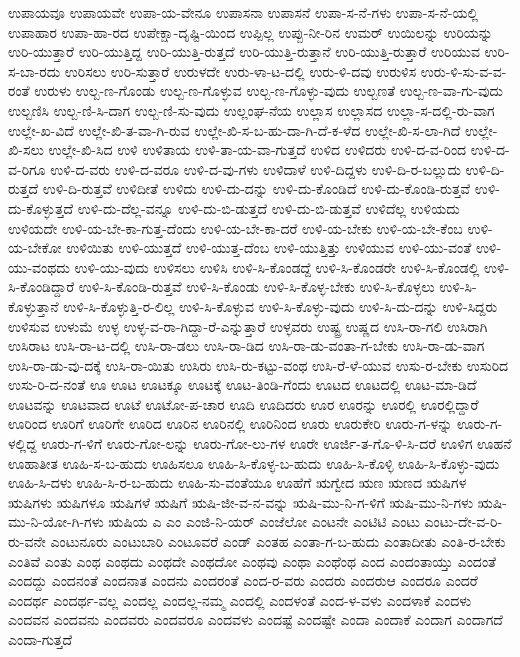{ಉಪಾಯವೂ
ಉಪಾಯವೇ
ಉಪಾ-ಯ-ವೇನೂ
ಉಪಾಸನಾ
ಉಪಾಸನೆ
ಉಪಾ-ಸ-ನೆ-ಗಳು
ಉಪಾ-ಸ-ನೆ-ಯಲ್ಲಿ
ಉಪಾಹಾರ
ಉಪಾ-ಹಾ-ರದ
ಉಪೇಕ್ಷಾ-ದೃಷ್ಟಿ-ಯಿಂದ
ಉಪ್ಪಿಲ್ಲ
ಉಪ್ಪು-ನೀ-ರಿನ
ಉಮರ್
ಉಯಿಲನ್ನು
ಉರಿಯನ್ನು
ಉರಿ-ಯುತ್ತಾರೆ
ಉರಿ-ಯುತ್ತಿದ್ದ
ಉರಿ-ಯುತ್ತಿ-ರುತ್ತದೆ
ಉರಿ-ಯುತ್ತಿ-ರುತ್ತಾನೆ
ಉರಿ-ಯುತ್ತಿ-ರುತ್ತಾರೆ
ಉರಿಯುವ
ಉರಿ-ಸ-ಬಾ-ರದು
ಉರಿಸಲು
ಉರಿ-ಸುತ್ತಾರೆ
ಉರುಳದೇ
ಉರು-ಳಾ-ಟ-ದಲ್ಲಿ
ಉರು-ಳಿ-ದವು
ಉರುಳಿಸ
ಉರು-ಳಿ-ಸು-ವ-ವ-ರಂತೆ
ಉರುಳು
ಉಲ್ಬ-ಣ-ಗೊಂಡು
ಉಲ್ಬ-ಣ-ಗೊಳ್ಳುವ
ಉಲ್ಬ-ಣ-ಗೊಳ್ಳು-ವುದು
ಉಲ್ಬಣತೆ
ಉಲ್ಬ-ಣ-ವಾ-ಗು-ವುದು
ಉಲ್ಬಣಿಸಿ
ಉಲ್ಬ-ಣಿ-ಸಿ-ದಾಗ
ಉಲ್ಬ-ಣಿ-ಸು-ವುದು
ಉಲ್ಲಂಘ-ನೆಯ
ಉಲ್ಲಾಸ
ಉಲ್ಲಾಸದ
ಉಲ್ಲಾ-ಸ-ದಲ್ಲಿ-ರು-ವಾಗ
ಉಲ್ಲೇ-ಖ-ವಿದೆ
ಉಲ್ಲೇ-ಖಿ-ತ-ವಾ-ಗಿ-ರುವ
ಉಲ್ಲೇ-ಖಿ-ಸ-ಬ-ಹು-ದಾ-ಗಿ-ದೆ-ಕ-ಳೆದ
ಉಲ್ಲೇ-ಖಿ-ಸ-ಲಾ-ಗಿದೆ
ಉಲ್ಲೇ-ಖಿ-ಸಲು
ಉಲ್ಲೇ-ಖಿ-ಸಿದ
ಉಳಿ
ಉಳಿತಾಯ
ಉಳಿ-ತಾ-ಯ-ವಾ-ಗುತ್ತದೆ
ಉಳಿದ
ಉಳಿದರು
ಉಳಿ-ದ-ವ-ರಿಂದ
ಉಳಿ-ದ-ವ-ರಿಗೂ
ಉಳಿ-ದ-ವರು
ಉಳಿ-ದ-ವರೂ
ಉಳಿ-ದ-ವು-ಗಳು
ಉಳಿದಾಳೆ
ಉಳಿ-ದಿದ್ದಳು
ಉಳಿ-ದಿ-ರ-ಬಲ್ಲುದು
ಉಳಿ-ದಿ-ರುತ್ತದೆ
ಉಳಿ-ದಿ-ರುತ್ತವೆ
ಉಳಿದೀತೆ
ಉಳಿದು
ಉಳಿ-ದು-ದನ್ನು
ಉಳಿ-ದು-ಕೊಂಡಿದೆ
ಉಳಿ-ದು-ಕೊಂಡಿ-ರುತ್ತವೆ
ಉಳಿ-ದು-ಕೊಳ್ಳುತ್ತದೆ
ಉಳಿ-ದು-ದೆಲ್ಲ-ವನ್ನೂ
ಉಳಿ-ದು-ಬಿ-ಡುತ್ತದೆ
ಉಳಿ-ದು-ಬಿ-ಡುತ್ತವೆ
ಉಳಿದೆಲ್ಲ
ಉಳಿಯದು
ಉಳಿಯದೇ
ಉಳಿ-ಯ-ಬೇ-ಕಾ-ಗುತ್ತ-ದೆಂದು
ಉಳಿ-ಯ-ಬೇ-ಕಾ-ದರೆ
ಉಳಿ-ಯ-ಬೇಕು
ಉಳಿ-ಯ-ಬೇ-ಕೆಂಬ
ಉಳಿ-ಯ-ಬೇಕೋ
ಉಳಿಯಿತು
ಉಳಿ-ಯುತ್ತದೆ
ಉಳಿ-ಯುತ್ತ-ದೆಂಬ
ಉಳಿ-ಯುತ್ತಿತ್ತು
ಉಳಿಯುವ
ಉಳಿ-ಯು-ವಂತೆ
ಉಳಿ-ಯು-ವಂಥದು
ಉಳಿ-ಯು-ವುದು
ಉಳಿಸಲು
ಉಳಿಸಿ
ಉಳಿ-ಸಿ-ಕೊಂಡದ್ದೆ
ಉಳಿ-ಸಿ-ಕೊಂಡರೇ
ಉಳಿ-ಸಿ-ಕೊಂಡಲ್ಲಿ
ಉಳಿ-ಸಿ-ಕೊಂಡಿದ್ದಾರೆ
ಉಳಿ-ಸಿ-ಕೊಂಡಿ-ರುತ್ತವೆ
ಉಳಿ-ಸಿ-ಕೊಂಡು
ಉಳಿ-ಸಿ-ಕೊಳ್ಳ-ಬೇಕು
ಉಳಿ-ಸಿ-ಕೊಳ್ಳಲು
ಉಳಿ-ಸಿ-ಕೊಳ್ಳುತ್ತಾನೆ
ಉಳಿ-ಸಿ-ಕೊಳ್ಳುತ್ತಿ-ರ-ಲಿಲ್ಲ
ಉಳಿ-ಸಿ-ಕೊಳ್ಳುವ
ಉಳಿ-ಸಿ-ಕೊಳ್ಳು-ವುದು
ಉಳಿ-ಸಿ-ದು-ದನ್ನು
ಉಳಿ-ಸಿದ್ದರು
ಉಳಿಸುವ
ಉಳುಮೆ
ಉಳ್ಳ
ಉಳ್ಳ-ವ-ರಾ-ಗಿದ್ದಾ-ರೆ-ಎನ್ನುತ್ತಾರೆ
ಉಳ್ಳವರು
ಉಷ್ಟ್ರ
ಉಷ್ಣದ
ಉಸಿ-ರಾ-ಗಲಿ
ಉಸಿರಾಗಿ
ಉಸಿರಾಟ
ಉಸಿ-ರಾ-ಟ-ದಲ್ಲಿ
ಉಸಿ-ರಾ-ಡಲು
ಉಸಿ-ರಾ-ಡಿದ
ಉಸಿ-ರಾ-ಡು-ವಂತಾ-ಗ-ಬೇಕು
ಉಸಿ-ರಾ-ಡು-ವಾಗ
ಉಸಿ-ರಾ-ಡು-ವು-ದಕ್ಕೆ
ಉಸಿ-ರಾ-ಯಿತು
ಉಸಿರು
ಉಸಿ-ರು-ಕಟ್ಟು-ವಂಥ
ಉಸಿ-ರೆ-ಳೆ-ಯುವ
ಉಸು-ರ-ಬೇಕು
ಉಸುರಿದ
ಉಸು-ರಿ-ದ-ನಂತೆ
ಊ
ಊಟ
ಊಟಕ್ಕೂ
ಊಟಕ್ಕೆ
ಊಟ-ತಿಂಡಿ-ಗೆಂದು
ಊಟದ
ಊಟದಲ್ಲಿ
ಊಟ-ಮಾ-ಡಿದೆ
ಊಟವನ್ನು
ಊಟವಾದ
ಊಟೆ
ಊಟೋ-ಪ-ಚಾರ
ಊದಿ
ಊದಿದರು
ಊರ
ಊರನ್ನು
ಊರಲ್ಲಿ
ಊರಲ್ಲಿದ್ದಾರೆ
ಊರಿಂದ
ಊರಿಗೆ
ಊರಿಗೇ
ಊರಿದ
ಊರಿನ
ಊರಿನಲ್ಲಿ
ಊರಿನಿಂದ
ಊರು
ಊರುಕೇರಿ
ಊರು-ಗ-ಳನ್ನು
ಊರು-ಗ-ಳಲ್ಲಿದ್ದ
ಊರು-ಗ-ಳಿಗೆ
ಊರು-ಗೋ-ಲನ್ನು
ಊರು-ಗೋ-ಲು-ಗಳ
ಊರೇ
ಊರ್ಜಿ-ತ-ಗೊ-ಳಿ-ಸಿ-ದರೆ
ಊಳಿಗ
ಊಹನೆ
ಊಹಾತೀತ
ಊಹಿ-ಸ-ಬ-ಹುದು
ಊಹಿಸಲೂ
ಊಹಿ-ಸಿ-ಕೊಳ್ಳ-ಬ-ಹುದು
ಊಹಿ-ಸಿ-ಕೊಳ್ಳಿ
ಊಹಿ-ಸಿ-ಕೊಳ್ಳು-ವುದು
ಊಹಿ-ಸಿ-ದಳು
ಊಹಿ-ಸಿ-ರ-ಬ-ಹುದು
ಊಹಿ-ಸು-ವಂತೆಯೂ
ಊಹೆಗೆ
ಋಗ್ವೇದ
ಋಣ
ಋಣದ
ಋಷಿಗಳ
ಋಷಿಗಳು
ಋಷಿಗಳೂ
ಋಷಿಗಳೆ
ಋಷಿಗೆ
ಋಷಿ-ಜೀ-ವ-ನ-ವನ್ನು
ಋಷಿ-ಮು-ನಿ-ಗ-ಳಿಗೆ
ಋಷಿ-ಮು-ನಿ-ಗಳು
ಋಷಿ-ಮು-ನಿ-ಯೋ-ಗಿ-ಗಳು
ಋಷಿಯ
ಎ
ಎಂ
ಎಂಜಿ-ನಿ-ಯರ್
ಎಂಜೆಲೋ
ಎಂಟನೇ
ಎಂಟಿಟಿ
ಎಂಟು
ಎಂಟು-ದೇ-ವ-ರಿ-ರು-ವನೇ
ಎಂಟುನೂರು
ಎಂಟುಬಾರಿ
ಎಂಟೂವರೆ
ಎಂಡ್
ಎಂತಹ
ಎಂತಾ-ಗ-ಬ-ಹುದು
ಎಂತಾದೀತು
ಎಂತಿ-ರ-ಬೇಕು
ಎಂತಿವೆ
ಎಂತು
ಎಂಥ
ಎಂಥದು
ಎಂಥದೇ
ಎಂಥದೋ
ಎಂಥವು
ಎಂಥಾ
ಎಂಥೆಂಥ
ಎಂದ
ಎಂದಂತಾಯ್ತು
ಎಂದಂತೆ
ಎಂದದ್ದು
ಎಂದನಂತೆ
ಎಂದನಾತ
ಎಂದನು
ಎಂದರಂತೆ
ಎಂದ-ರ-ವರು
ಎಂದರು
ಎಂದರುಆ
ಎಂದರೂ
ಎಂದರೆ
ಎಂದರ್ಥ
ಎಂದರ್ಥ-ವಲ್ಲ
ಎಂದಲ್ಲ
ಎಂದಲ್ಲ-ನಮ್ಮ
ಎಂದಲ್ಲಿ
ಎಂದಳಂತೆ
ಎಂದ-ಳ-ವಳು
ಎಂದಳಾಕೆ
ಎಂದಳು
ಎಂದವನ
ಎಂದವನು
ಎಂದವರು
ಎಂದವರೂ
ಎಂದವಳು
ಎಂದಷ್ಟೆ
ಎಂದಷ್ಟೇ
ಎಂದಾ
ಎಂದಾಕೆ
ಎಂದಾಗ
ಎಂದಾಗದೆ
ಎಂದಾ-ಗುತ್ತದೆ
}
